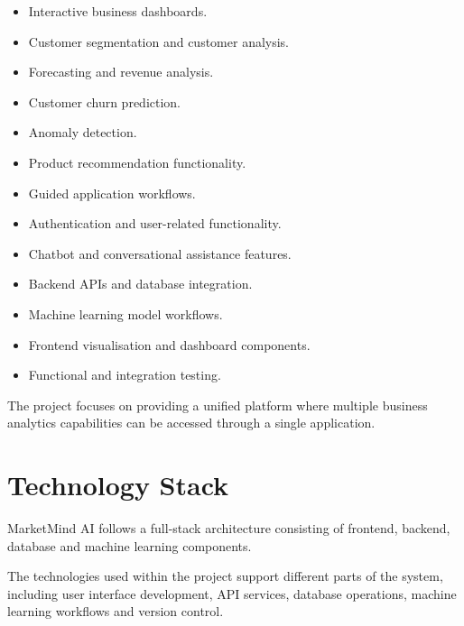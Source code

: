 \documentclass[12pt,a4paper]{report}
\begin{document}
\begin{itemize}[leftmargin=1.2cm]

\item Interactive business dashboards.

\item Customer segmentation and customer analysis.

\item Forecasting and revenue analysis.

\item Customer churn prediction.

\item Anomaly detection.

\item Product recommendation functionality.

\item Guided application workflows.

\item Authentication and user-related functionality.

\item Chatbot and conversational assistance features.

\item Backend APIs and database integration.

\item Machine learning model workflows.

\item Frontend visualisation and dashboard components.

\item Functional and integration testing.

\end{itemize}

The project focuses on providing a unified platform where multiple
business analytics capabilities can be accessed through a single
application.



\chapter{Technology Stack}

MarketMind AI follows a full-stack architecture consisting of frontend,
backend, database and machine learning components.

The technologies used within the project support different parts of the
system, including user interface development, API services, database
operations, machine learning workflows and version control.
\end{document}
